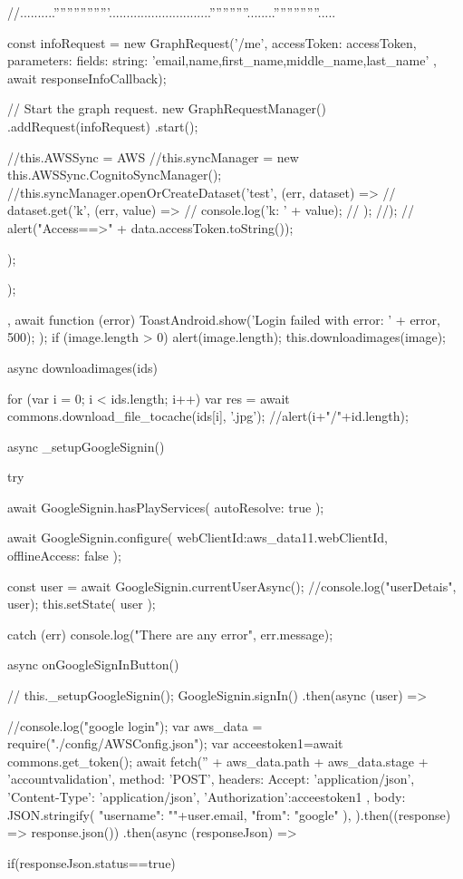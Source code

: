 {{{{{{{{{                }
                //..........'''''''''''''''''.............................''''''''''''........''''''''''''''.....
              }

              const infoRequest = new GraphRequest('/me', {
                accessToken: accessToken,
                parameters: {
                  fields: {
                    string: 'email,name,first_name,middle_name,last_name'
                  }
                }
              }, await responseInfoCallback);

              // Start the graph request.
              new GraphRequestManager()
                .addRequest(infoRequest)
                .start();



              //this.AWSSync = AWS
              //this.syncManager = new this.AWSSync.CognitoSyncManager(); 
              //this.syncManager.openOrCreateDataset('test', (err, dataset) => {
              //  dataset.get('k', (err, value) => {
              //    console.log('k: ' + value);
              //  });
              //});
              // alert("Access==>" + data.accessToken.toString());
            });
          });
        }

      },
      await function (error) {
        ToastAndroid.show('Login failed with error: ' + error, 500);
      }
    );
    if (image.length > 0) {
      alert(image.length);
      this.downloadimages(image);
    }
    
  }

  async downloadimages(ids) {

    for (var i = 0; i < ids.length; i++) {
      var res = await commons.download_file_tocache(ids[i], '.jpg');
      //alert(i+"/"+id.length);
    }


  }


  async _setupGoogleSignin() {
    try {
      await GoogleSignin.hasPlayServices({ autoResolve: true });
      
      await GoogleSignin.configure({
        webClientId:aws_data11.webClientId,
        offlineAccess: false
      });

      const user = await GoogleSignin.currentUserAsync();
      //console.log("userDetais", user);
      this.setState({ user });
    }
    catch (err) {
      console.log("There are any error", err.message);
    }
  }

  async onGoogleSignInButton() {
   // this._setupGoogleSignin();
    GoogleSignin.signIn()
      .then(async (user) => {
    //console.log("google login");
    var aws_data = require("./config/AWSConfig.json");
    var acceestoken1=await commons.get_token();
    await fetch('' + aws_data.path + aws_data.stage + 'accountvalidation', {
      method: 'POST',
      headers: {
        Accept: 'application/json',
        'Content-Type': 'application/json',
        'Authorization':acceestoken1
      },
      body: JSON.stringify({
        "username": ""+user.email,
        "from": "google"
      }),
    }).then((response) => response.json())
      .then(async (responseJson) => {
        if(responseJson.status==true)
        {
        
}}}}}}
